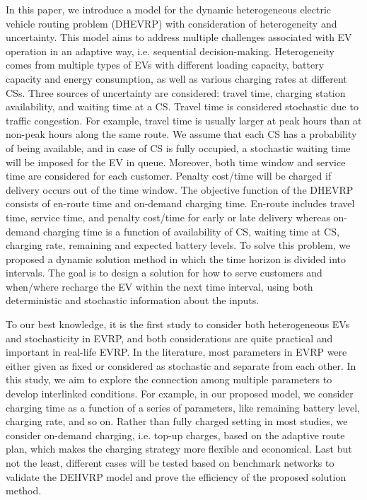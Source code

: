 \documentclass[11pt]{article}
\begin{document}
In this paper, we introduce a model for the dynamic heterogeneous electric vehicle routing problem (DHEVRP) with consideration of heterogeneity and uncertainty. This model aims to address multiple challenges associated with EV operation in an adaptive way, i.e. sequential decision-making. Heterogeneity comes from multiple types of EVs with different loading capacity, battery capacity and energy consumption, as well as various charging rates at different CSs. Three sources of uncertainty are considered: travel time, charging station availability, and waiting time at a CS. Travel time is considered stochastic due to traffic congestion. For example, travel time is usually larger at peak hours than at non-peak hours along the same route. We assume that each CS has a probability of being available, and in case of CS is fully occupied, a stochastic waiting time will be imposed for the EV in queue. Moreover, both time window and service time are considered for each customer. Penalty cost/time will be charged if delivery occurs out of the time window. The objective function of the DHEVRP consists of en-route time and on-demand charging time. En-route includes travel time, service time, and penalty cost/time for early or late delivery whereas on-demand charging time is a function of availability of CS, waiting time at CS, charging rate, remaining and expected battery levels. To solve this problem, we proposed a dynamic solution method in which the time horizon is divided into intervals. The goal is to design a solution for how to serve customers and when/where recharge the EV within the next time interval, using both deterministic and stochastic information about the inputs.

To our best knowledge, it is the first study to consider both heterogeneous EVs and stochasticity in EVRP, and both considerations are quite practical and important in real-life EVRP. In the literature, most parameters in EVRP were either given as fixed or considered as stochastic and separate from each other. In this study, we aim to explore the connection among multiple parameters to develop interlinked conditions. For example, in our proposed model, we consider charging time as a function of a series of parameters, like remaining battery level, charging rate, and so on. Rather than fully charged setting in most studies, we consider on-demand charging, i.e. top-up charges, based on the adaptive route plan, which makes the charging strategy more flexible and economical. Last but not the least, different cases will be tested based on benchmark networks to validate the DEHVRP model and prove the efficiency of the proposed solution method.
\end{document}
